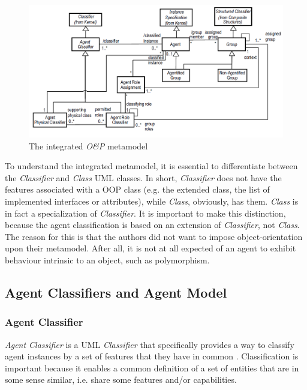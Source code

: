\begin{figure}[ht]
	\centering
	\includegraphics[width=\textwidth]{images/onp/onp-metamodel.png}
	\caption{The integrated \textit{O\&P} metamodel \cite{Odell05}}
	\label{figure:onp-metamodel}
\end{figure}

To understand the integrated metamodel, it is essential to differentiate between the \textit{Classifier} and \textit{Class} UML classes.
In short, \textit{Classifier} does not have the features associated with a OOP class (e.g. the extended class, the list of implemented interfaces or attributes), while \textit{Class}, obviously, has them.
\textit{Class} is in fact a specialization of \textit{Classifier}.
It is important to make this distinction, because the agent classification is based on an extension of \textit{Classifier}, not \textit{Class}.
The reason for this is that the authors did not want to impose object-orientation upon their metamodel.
After all, it is not at all expected of an agent to exhibit behaviour intrinsic to an object, such as polymorphism.

\subsection{Agent Classifiers and Agent Model}

\subsubsection*{Agent Classifier}

\textit{Agent Classifier} is a UML \textit{Classifier} that specifically provides a way to classify agent instances by a set of features that they have in common \cite{Odell05}.
Classification is important because it enables a common definition of a set of entities that are in some sense similar, i.e. share some features and/or capabilities.

